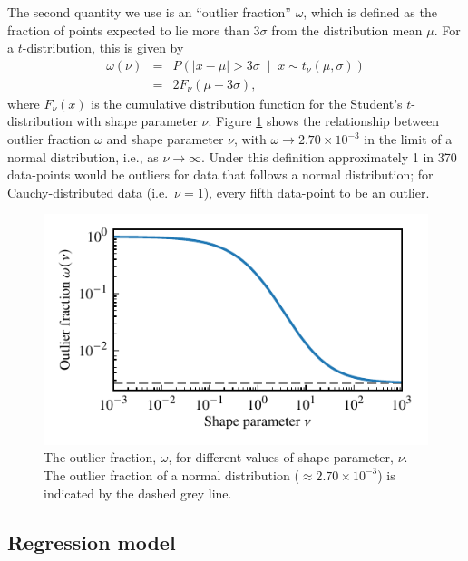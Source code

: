 \documentclass[fleqn,usenatbib]{rasti}
\newcommand{\studentt}[2]{t_\nu \left( #1, #2 \right)}
\begin{document}
The second quantity we use is an ``outlier fraction'' $\omega$, which
is defined as the fraction of points expected to lie more than $3\sigma$ from the
distribution mean $\mu$. For a $t$-distribution, this is given by
\begin{eqnarray}
    \omega(\nu)
    &=& P\left(
        \left|x - \mu \right| > 3 \sigma \;
        \middle| \;
        x \sim \studentt{\mu}{\sigma}
    \right) \label{eqn:model.outlier_frac}\\
    &=& 2 F_\nu \left(\mu - 3 \sigma \right),
\end{eqnarray}
where $F_\nu(x)$ is the cumulative distribution function for the Student's
$t$-distribution with shape parameter $\nu$. Figure \ref{fig:model.outlier_frac}
shows the relationship between outlier fraction $\omega$ and shape parameter
$\nu$, with $\omega \rightarrow 2.70 \times 10^{-3} $ in the limit of a normal
distribution, i.e., as $\nu \rightarrow \infty$.  Under this definition
approximately 1 in 370 data-points would be outliers for data that follows a
normal distribution; for Cauchy-distributed data (i.e.\ $\nu = 1$), every fifth
data-point to be an outlier.

\begin{figure}
	\includegraphics{graphics/outlier_frac.pdf}
    \caption{The outlier fraction, $\omega$, for different values of shape
    parameter, $\nu$. The outlier fraction of a normal distribution ($\approx
    2.70 \times 10^{-3}$) is indicated by the dashed grey line.}
    \label{fig:model.outlier_frac}
\end{figure}

\subsection{Regression model}
\label{sec:formalism.model}
\end{document}
